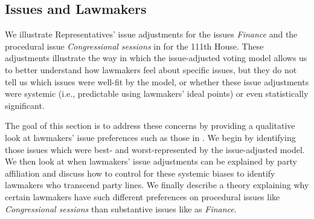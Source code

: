 

\subsection{Issues and Lawmakers}

\label{sec:lawmakers}
\label{sec:issues}

We illustrate Representatives' issue adjustments for the issues
\emph{Finance} and the procedural issue \emph{Congressional sessions}
in  for the 111th House.  These
adjustments illustrate the way in which the issue-adjusted voting
model allows us to better understand how lawmakers feel about specific
issues, but they do not tell us which issues were well-fit by the
model, or whether these issue adjustments were systemic (i.e.,
predictable using lawmakers' ideal points) or even statistically
significant.

The goal of this section is to address these concerns by providing a
qualitative look at lawmakers' issue preferences such as those in
.  We begin by identifying those
issues which were best- and worst-represented by the issue-adjusted
model.  We then look at when lawmakers' issue adjustments can be
explained by party affiliation and discuss how to control for these
systemic biases to identify lawmakers who transcend party lines.  We
finally describe a theory explaining why certain lawmakers have such
different preferences on procedural issues like \emph{Congressional
  sessions} than substantive issues like as \emph{Finance}.

